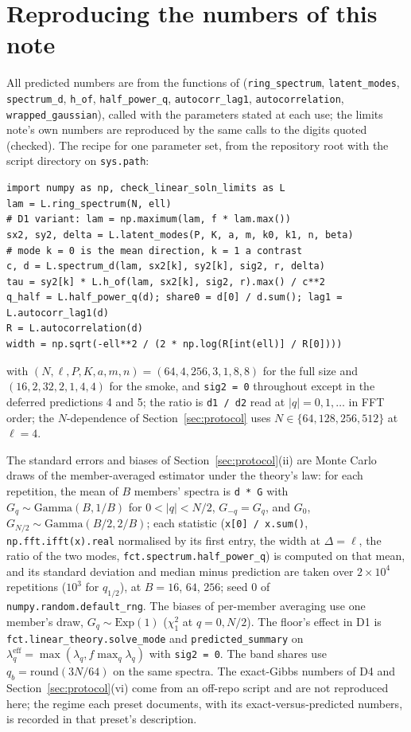 \documentclass[11pt,a4paper]{article}
\newcommand{\code}[1]{\texttt{#1}}
\begin{document}
\section{Reproducing the numbers of this note}
\label{app:numbers}
All predicted numbers are from the functions of  (\code{ring\_spectrum}, \code{latent\_modes}, \code{spectrum\_d}, \code{h\_of}, \code{half\_power\_q}, \code{autocorr\_lag1}, \code{autocorrelation}, \code{wrapped\_gaussian}), called with the parameters stated at each use; the limits note's own numbers are reproduced by the same calls to the digits quoted (checked). The recipe for one parameter set, from the repository root with the script directory on \code{sys.path}:
\begin{verbatim}
import numpy as np, check_linear_soln_limits as L
lam = L.ring_spectrum(N, ell)
# D1 variant: lam = np.maximum(lam, f * lam.max())
sx2, sy2, delta = L.latent_modes(P, K, a, m, k0, k1, n, beta)
# mode k = 0 is the mean direction, k = 1 a contrast
c, d = L.spectrum_d(lam, sx2[k], sy2[k], sig2, r, delta)
tau = sy2[k] * L.h_of(lam, sx2[k], sig2, r).max() / c**2
q_half = L.half_power_q(d); share0 = d[0] / d.sum(); lag1 = L.autocorr_lag1(d)
R = L.autocorrelation(d)
width = np.sqrt(-ell**2 / (2 * np.log(R[int(ell)] / R[0])))
\end{verbatim}
with $(N, \ell, P, K, a, m, n) = (64, 4, 256, 3, 1, 8, 8)$ for the full size and $(16, 2, 32, 2, 1, 4, 4)$ for the smoke, and \code{sig2 = 0} throughout except in the deferred predictions 4 and 5; the ratio is \code{d1 / d2} read at $|q| = 0, 1, \dots$ in FFT order; the $N$-dependence of Section~\ref{sec:protocol} uses $N\in\{64,128,256,512\}$ at $\ell = 4$.

The standard errors and biases of Section~\ref{sec:protocol}(ii) are Monte Carlo draws of the member-averaged estimator under the theory's law: for each repetition, the mean of $B$ members' spectra is \code{d * G} with $G_q\sim\mathrm{Gamma}(B, 1/B)$ for $0 < |q| < N/2$, $G_{-q} = G_q$, and $G_0$, $G_{N/2}\sim\mathrm{Gamma}(B/2, 2/B)$; each statistic (\code{x[0] / x.sum()}, \code{np.fft.ifft(x).real} normalised by its first entry, the width at $\Delta = \ell$, the ratio of the two modes, \code{fct.spectrum.half\_power\_q}) is computed on that mean, and its standard deviation and median minus prediction are taken over $2\times10^4$ repetitions ($10^3$ for $q_{1/2}$), at $B = 16$, $64$, $256$; seed $0$ of \code{numpy.random.default\_rng}. The biases of per-member averaging use one member's draw, $G_q\sim\mathrm{Exp}(1)$ ($\chi^2_1$ at $q = 0, N/2$). The floor's effect in D1 is \code{fct.linear\_theory.solve\_mode} and \code{predicted\_summary} on $\lambda_q^{\mathrm{eff}} = \max(\lambda_q, f\max_q\lambda_q)$ with \code{sig2 = 0}. The band shares use $q_b = \mathrm{round}(3N/64)$ on the same spectra. The exact-Gibbs numbers of D4 and Section~\ref{sec:protocol}(vi) come from an off-repo script and are not reproduced here; the regime each preset documents, with its exact-versus-predicted numbers, is recorded in that preset's description.
\end{document}
